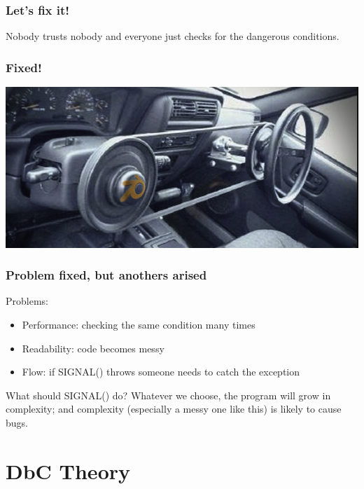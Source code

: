 \documentclass{beamer}
\begin{document}
\begin{frame}
\frametitle{Let's fix it!}

\pause
\begin{block}{}
Nobody trusts nobody and everyone just checks for the dangerous conditions.
\end{block}
\end{frame}

\begin{frame}
\frametitle{Fixed!}
\begin{center}
\includegraphics[scale=0.55]{steering_wheel}
\end{center}
\end{frame}

\begin{frame}
\frametitle{Problem fixed, but anothers arised}
Problems:
\begin{itemize}[<+->]
  \item Performance: checking the same condition many times
  \item Readability: code becomes messy
  \item Flow: if SIGNAL() throws someone needs to catch the exception
\end{itemize}
\pause
\begin{block}{What should SIGNAL() do?}
\pause
Whatever we choose, the program will grow in complexity; and complexity (especially a messy one like this) is likely to cause bugs.
\end{block}
\end{frame}



\section{DbC Theory}
\end{document}
